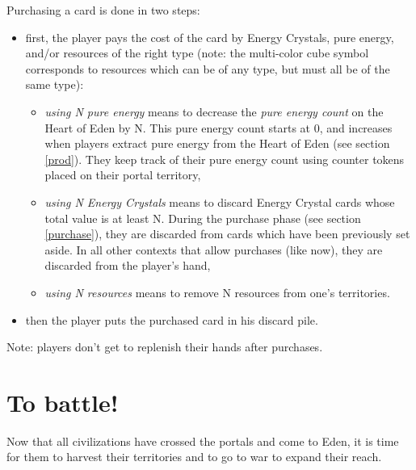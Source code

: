 \documentclass[a4paper]{article}
\begin{document}
        Purchasing a card is done in two steps:
        \vspace{-1.3em}
        \begin{itemize}
            \item first, the player pays the cost of the card by Energy Crystals, 
                 pure energy, and/or resources of the right type
                (note: the multi-color cube symbol corresponds to resources
                which can be of any type, but must all be of the same type):
                \vspace{-0.5em}
                \begin{itemize}
                    \item \textit{using N pure energy} means to decrease the
                    \textit{pure energy count} on the Heart of Eden by N.
                    This pure energy count starts at 0,
                    and increases when players extract pure energy from the Heart of Eden
                    (see section \ref{prod}).
                    They keep track of their pure energy count using counter
                    tokens placed on their portal territory,
                    \item \textit{using N Energy Crystals} means to discard Energy Crystal
                        cards whose total value is at least N.
                        During the purchase phase (see section \ref{purchase}),
                        they are discarded from cards which have been previously set aside.
                        In all other contexts that allow purchases (like now),
                        they are discarded from the player's hand,
                    \item \textit{using N resources} means to remove N resources
                        from one's territories.
                \end{itemize}
            \item then the player puts the purchased card in his discard pile.
        \end{itemize}
        
        Note: players don't get to replenish their hands after purchases.


\section{To battle!}

    Now that all civilizations have crossed the portals and come to Eden,
    it is time for them to harvest their territories and to go to war to expand
    their reach.
    
\end{document}
